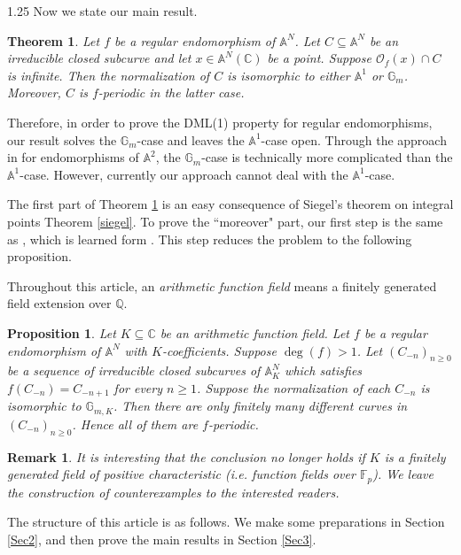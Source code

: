 \documentclass[12pt]{article}
\newtheorem{theorem}[definition]{Theorem}
\newtheorem{proposition}[definition]{Proposition}
\newtheorem{remark}[definition]{Remark}
\begin{document}
\begin{spacing}{1.25}
Now we state our main result.

\begin{theorem}\label{mainthm}
Let $f$ be a regular endomorphism of $\mathbb{A}^N$. Let $C\subseteq\mathbb{A}^N$ be an irreducible closed subcurve and let $x\in\mathbb{A}^N(\mathbb{C})$ be a point. Suppose $\mathcal{O}_f(x)\cap C$ is infinite. Then the normalization of $C$ is isomorphic to either $\mathbb{A}^1$ or $\mathbb{G}_m$. Moreover, $C$ is $f$-periodic in the latter case.
\end{theorem}

Therefore, in order to prove the DML(1) property for regular endomorphisms, our result solves the $\mathbb{G}_m$-case and leaves the $\mathbb{A}^1$-case open. Through the approach in \cite{Xie17} for endomorphisms of $\mathbb{A}^2$, the $\mathbb{G}_m$-case is technically more complicated than the $\mathbb{A}^1$-case. However, currently our approach cannot deal with the $\mathbb{A}^1$-case.

The first part of Theorem \ref{mainthm} is an easy consequence of Siegel's theorem on integral points Theorem \ref{siegel}. To prove the ``moreover" part, our first step is the same as \cite[p. 6, Step 1]{YZ}, which is learned form \cite[Section 8]{Xie17}. This step reduces the problem to the following proposition.

Throughout this article, an \emph{arithmetic function field} means a finitely generated field extension over $\mathbb{Q}$.

\begin{proposition}\label{mainprop}
Let $K\subseteq\mathbb{C}$ be an arithmetic function field. Let $f$ be a regular endomorphism of $\mathbb{A}^N$ with $K$-coefficients. Suppose $\deg(f)>1$. Let $(C_{-n})_{n\geq0}$ be a sequence of irreducible closed subcurves of $\mathbb{A}_{K}^N$ which satisfies $f(C_{-n})=C_{-n+1}$ for every $n\geq1$. Suppose the normalization of each $C_{-n}$ is isomorphic to $\mathbb{G}_{m,K}$. Then there are only finitely many different curves in $(C_{-n})_{n\geq0}$. Hence all of them are $f$-periodic.
\end{proposition}

\begin{remark}
It is interesting that the conclusion no longer holds if $K$ is a finitely generated field of positive characteristic (i.e. function fields over $\mathbb{F}_p$). We leave the construction of counterexamples to the interested readers.
\end{remark}

The structure of this article is as follows. We make some preparations in Section \ref{Sec2}, and then prove the main results in Section \ref{Sec3}.


\end{spacing}
\end{document}
